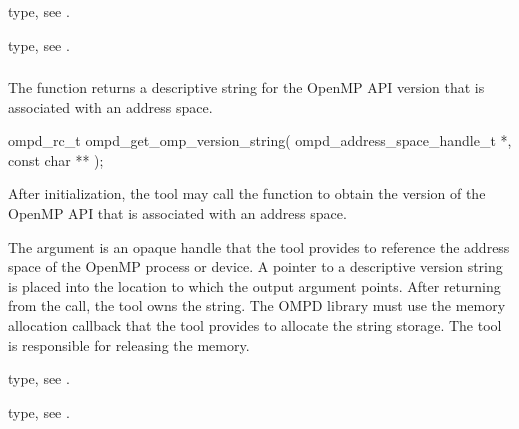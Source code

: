 \begin{crossrefs}
\item {} type, 
see .

\item {} type, see .
\end{crossrefs}



\subsubsection{}
\label{subsubsubsec:ompd_get_omp_version_string}

\summary
The  function returns a descriptive 
string for the OpenMP API version that is associated with an address space.

\format
\begin{cspecific}
\begin{ompSyntax}
ompd_rc_t ompd_get_omp_version_string(
  ompd_address_space_handle_t *,
  const char **
);
\end{ompSyntax}
\end{cspecific}

\descr
After initialization, the tool may call the  
function to obtain the version of the OpenMP API that is associated with an 
address space.

\argdesc
The  argument is an opaque handle that the tool provides
to reference the address space of the OpenMP process or device. A pointer to 
a descriptive version string is placed into the location to which the 
 output argument points. After returning from the call, the tool 
owns the string. The OMPD library must use the memory allocation callback that 
the tool provides to allocate the string storage. The tool is responsible 
for releasing the memory.

\begin{crossrefs}
\item {} type, 
see .

\item {} type, see .
\end{crossrefs}




